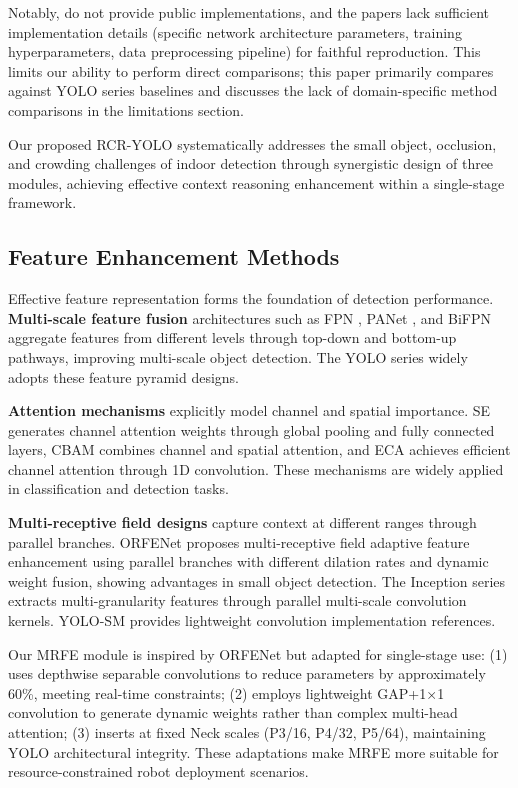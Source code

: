 \documentclass[journal]{IEEEtran}
\begin{document}
Notably, \cite{chen2020enhanced,zhang2021indoor} do not provide public implementations, and the papers lack sufficient implementation details (specific network architecture parameters, training hyperparameters, data preprocessing pipeline) for faithful reproduction. This limits our ability to perform direct comparisons; this paper primarily compares against YOLO series baselines and discusses the lack of domain-specific method comparisons in the limitations section.

Our proposed RCR-YOLO systematically addresses the small object, occlusion, and crowding challenges of indoor detection through synergistic design of three modules, achieving effective context reasoning enhancement within a single-stage framework.

\subsection{Feature Enhancement Methods}

Effective feature representation forms the foundation of detection performance. \textbf{Multi-scale feature fusion} architectures such as FPN \cite{lin2017fpn}, PANet \cite{liu2018path}, and BiFPN \cite{tan2020efficientdet} aggregate features from different levels through top-down and bottom-up pathways, improving multi-scale object detection. The YOLO series widely adopts these feature pyramid designs.

\textbf{Attention mechanisms} explicitly model channel and spatial importance. SE \cite{hu2018squeeze} generates channel attention weights through global pooling and fully connected layers, CBAM \cite{woo2018cbam} combines channel and spatial attention, and ECA \cite{wang2020eca} achieves efficient channel attention through 1D convolution. These mechanisms are widely applied in classification and detection tasks.

\textbf{Multi-receptive field designs} capture context at different ranges through parallel branches. ORFENet \cite{orfe2021} proposes multi-receptive field adaptive feature enhancement using parallel branches with different dilation rates and dynamic weight fusion, showing advantages in small object detection. The Inception series \cite{szegedy2015going} extracts multi-granularity features through parallel multi-scale convolution kernels. YOLO-SM \cite{yolosm2022} provides lightweight convolution implementation references.

Our MRFE module is inspired by ORFENet but adapted for single-stage use: (1) uses depthwise separable convolutions to reduce parameters by approximately 60\%, meeting real-time constraints; (2) employs lightweight GAP+1×1 convolution to generate dynamic weights rather than complex multi-head attention; (3) inserts at fixed Neck scales (P3/16, P4/32, P5/64), maintaining YOLO architectural integrity. These adaptations make MRFE more suitable for resource-constrained robot deployment scenarios.
\end{document}
